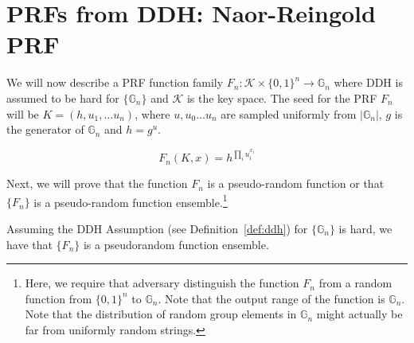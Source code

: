 




\section{PRFs from DDH: Naor-Reingold PRF}
We will now describe a PRF function family $F_n: \mathcal{K} \times \{0,1\}^n \rightarrow \mathbb{G}_n$ where DDH is assumed to be hard for  $\{\mathbb{G}_n\}$ and $\mathcal{K}$ is the key space.
The seed for the PRF $F_n$ will be $K =  (h, u_1, \ldots u_n)$, where $u,u_0\ldots u_n$ are sampled uniformly from $|\mathbb{G}_n|$, $g$ is the generator of $\mathbb{G}_n$ and $h = g^u$. 

\[F_n(K,x) = h^{\prod_{i} u_i^{x_i}}\]

Next, we will prove that the function $F_n$ is a pseudo-random function or that $\{F_n\}$ is a pseudo-random function ensemble.\footnote{Here, we require that adversary distinguish the function $F_n$ from a random function from $\{0,1\}^n$ to $\mathbb{G}_n$. Note that the output range of the function is $\mathbb{G}_n$. Note that the distribution of random group elements in $\mathbb{G}_n$ might actually be far from uniformly random strings.}
\begin{lemma}
Assuming the DDH Assumption (see Definition~\ref{def:ddh}) for $\{\mathbb{G}_n\}$ is hard, we have that $\{F_n\}$ is a pseudorandom function ensemble.
\end{lemma}
